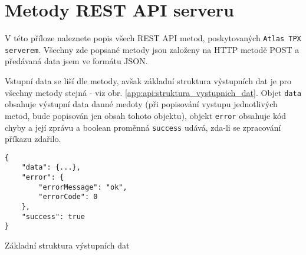 

\chapter{Metody REST API serveru}\label{app:api}
V této příloze naleznete popis všech REST API metod, poskytovaných \texttt{Atlas TPX serverem}. Všechny zde popsané metody jsou založeny na HTTP metodě POST a předávaná data jsem ve formátu JSON. 

Vstupní data se liší dle metody, avšak základní struktura výstupních dat je pro všechny metody stejná - viz obr. \ref{app:api:struktura_vystupnich_dat}. Objet \texttt{data} obsahuje výstupní data danné medoty (při popisování vystupu jednotlivých metod, bude popisován jen obsah tohoto objektu), objekt \texttt{error} obsahuje kód chyby a její zprávu a boolean proměnná \texttt{success} udává, zda-li se zpracování příkazu zdařilo.


	
\begin{verbatim}
{
	"data": {...},
	"error": {
		"errorMessage": "ok",
		"errorCode": 0
	},
	"success": true
}
\end{verbatim}
\begin{code}[th!]
	\caption{Základní struktura výstupních dat}
	\label{app:api:struktura_vystupnich_dat}
\end{code}

\section{}